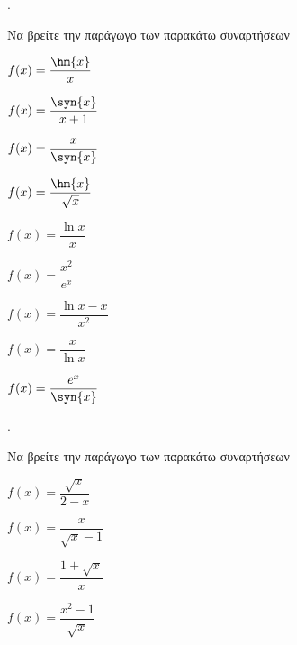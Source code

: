 \documentclass[11pt,a4paper,twocolumn]{article}
\newcounter{askhsh}
\newcommand{\askhsh}{{\large\theaskhsh.}\ \addtocounter{askhsh}{1}}
\begin{document}
\askhsh Να βρείτε την παράγωγο των παρακάτω συναρτήσεων
\begin{multicols}{2}
\begin{alist}
\item $ f(x)=\dfrac{\hm{x}}{x} $
\item $ f(x)=\dfrac{\syn{x}}{x+1} $
\item $ f(x)=\dfrac{x}{\syn{x}} $
\item $ f(x)=\dfrac{\hm{x}}{\sqrt{x}} $
\item $ f(x)=\dfrac{\ln{x}}{x}$
\item $ f(x)=\dfrac{x^2}{e^x}$
\item $ f(x)=\dfrac{\ln{x}-x}{x^2}$
\item $ f(x)=\dfrac{x}{\ln{x}}$
\item $ f(x)=\dfrac{e^x}{\syn{x}}$
\end{alist}
\end{multicols}
\askhsh Να βρείτε την παράγωγο των παρακάτω συναρτήσεων
\begin{multicols}{2}
\begin{alist}
\item $ f(x)=\dfrac{\sqrt{x}}{2-x} $
\item $ f(x)=\dfrac{x}{\sqrt{x}-1} $
\item $ f(x)=\dfrac{1+\sqrt{x}}{x} $
\item $ f(x)=\dfrac{x^2-1}{\sqrt{x}} $
\end{alist}
\end{multicols}
\end{document}
